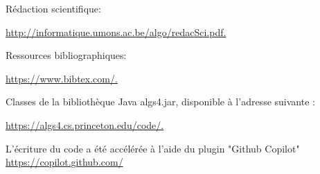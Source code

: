 Rédaction scientifique:

\href{http://informatique.umons.ac.be/algo/redacSci.pdf.}{http://informatique.umons.ac.be/algo/redacSci.pdf.
}

Ressources bibliographiques:

\href{https://www.bibtex.com/.}{https://www.bibtex.com/.}


Classes de la bibliothèque Java
algs4.jar, disponible à l’adresse suivante :

\href{https://algs4.cs.princeton.edu/code/.}{https://algs4.cs.princeton.edu/code/.}

L'écriture du code a été accélérée à l'aide du plugin "Github Copilot"
\href{https://copilot.github.com/}{https://copilot.github.com/}



